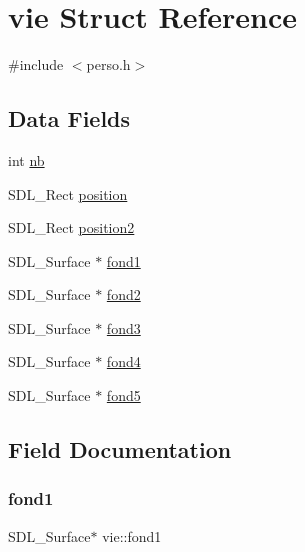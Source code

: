 \hypertarget{structvie}{}\section{vie Struct Reference}
\label{structvie}


{\ttfamily \#include $<$perso.\+h$>$}

\subsection*{Data Fields}
\begin{DoxyCompactItemize}
\item 
int \hyperlink{structvie_a02356445cb49a7290950ab15cebccdd9}{nb}
\item 
S\+D\+L\+\_\+\+Rect \hyperlink{structvie_a916050892cf1e7b8039952dcafa44825}{position}
\item 
S\+D\+L\+\_\+\+Rect \hyperlink{structvie_a564dc9c3b28da24d81318d703ebc4e59}{position2}
\item 
S\+D\+L\+\_\+\+Surface $\ast$ \hyperlink{structvie_a7616ae8ecc97b7fb2d92be6a858014ad}{fond1}
\item 
S\+D\+L\+\_\+\+Surface $\ast$ \hyperlink{structvie_a6ecad7f4161cb602faa27d2de9e3ee50}{fond2}
\item 
S\+D\+L\+\_\+\+Surface $\ast$ \hyperlink{structvie_a9763ef794bb12262f5826b911d20e42b}{fond3}
\item 
S\+D\+L\+\_\+\+Surface $\ast$ \hyperlink{structvie_a0b08072b8c7ec9e1adfd6e26b4fcb39f}{fond4}
\item 
S\+D\+L\+\_\+\+Surface $\ast$ \hyperlink{structvie_adabeccdf7e33dd53ac6d85a24fc3931d}{fond5}
\end{DoxyCompactItemize}


\subsection{Field Documentation}
\mbox{\label{structvie_a7616ae8ecc97b7fb2d92be6a858014ad}} 
\subsubsection{\texorpdfstring{fond1}{fond1}}
{\footnotesize\ttfamily S\+D\+L\+\_\+\+Surface$\ast$ vie\+::fond1}

\mbox{\label{structvie_a6ecad7f4161cb602faa27d2de9e3ee50}} 
